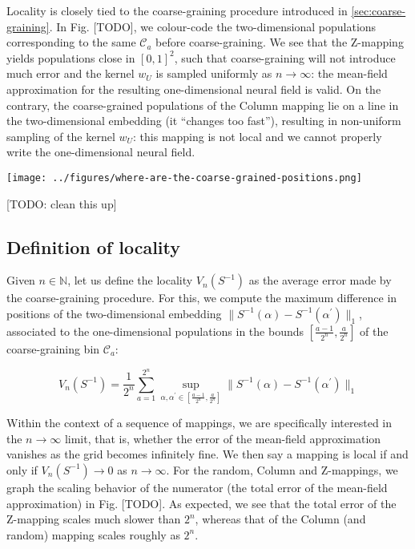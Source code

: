 \documentclass[10pt,letterpaper]{article}
\newcommand{\norm}[1]{\lVert{#1}\rVert}
\begin{document}
Locality is closely tied to the coarse-graining procedure introduced in \autoref{sec:coarse-graining}. 
In Fig. [TODO], we colour-code the two-dimensional populations corresponding to the same $\mathcal{C}_a$ before coarse-graining.
We see that the Z-mapping yields populations close in $[0,1]^2$, such that coarse-graining will not introduce much error and the kernel $w_U$ is sampled uniformly as $n \to \infty$: the mean-field approximation for the resulting one-dimensional neural field is valid. On the contrary, the coarse-grained populations of the Column mapping lie on a line in the two-dimensional embedding (it ``changes too fast''), resulting in non-uniform sampling of the kernel $w_U$: this mapping is not local and we cannot properly write the one-dimensional neural field.

\texttt{[image: ../figures/where-are-the-coarse-grained-positions.png]}

[TODO: clean this up]
\endif

\subsection{Definition of locality}

Given $n \in \mathbb N$, let us define the locality $V_n(S^{-1})$ as the average error made by the coarse-graining procedure. For this, we compute the maximum difference in positions of the two-dimensional embedding $\norm{S^{-1}(\alpha) - S^{-1}(\alpha^\prime)}_1$, associated to the one-dimensional populations in the bounds $\left[\tfrac{a-1}{2^n}, \tfrac{a}{2^n}\right]$ of the coarse-graining bin $\mathcal C_a$:

\begin{equation} \label{eq:def-V}
V_n(S^{-1}) = \frac{1}{2^n} \sum_{a=1}^{2^n} \sup_{\alpha, \alpha^\prime \in \left[\frac{a-1}{2^n}, \frac{a}{2^n} \right]} \norm{S^{-1}(\alpha) - S^{-1}(\alpha^\prime)}_1
\end{equation}

Within the context of a sequence of mappings, we are specifically interested in the $n \to \infty$ limit, that is, whether the error of the mean-field approximation vanishes as the grid becomes infinitely fine. We then say a mapping is local if and only if $V_n(S^{-1}) \to 0$ as $n \to \infty$. For the random, Column and Z-mappings, we graph the scaling behavior of the numerator (the total error of the mean-field approximation) in Fig. [TODO]. As expected, we see that the total error of the Z-mapping scales much slower than $2^n$, whereas that of the Column (and random) mapping scales roughly as $2^n$.
\end{document}
